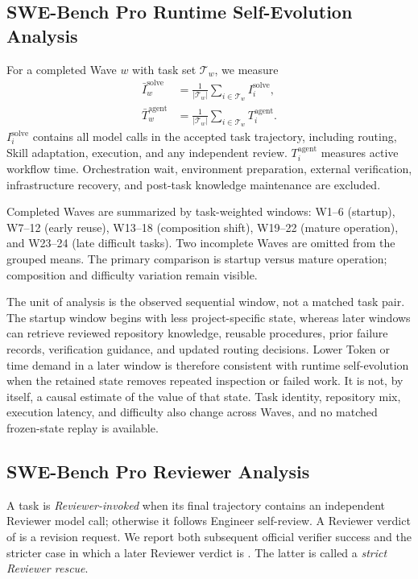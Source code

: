 \subsection{SWE-Bench Pro Runtime Self-Evolution Analysis}

For a completed \systemname Wave $w$ with task set $\mathcal{T}_w$, we measure
\begin{align}
  \bar I_w^{\mathrm{solve}}
  &= \frac{1}{|\mathcal{T}_w|}
     \sum_{i\in\mathcal{T}_w} I_i^{\mathrm{solve}},
  \label{eq:solve-token-wave}\\
  \bar T_w^{\mathrm{agent}}
  &= \frac{1}{|\mathcal{T}_w|}
     \sum_{i\in\mathcal{T}_w} T_i^{\mathrm{agent}}.
  \label{eq:solve-time-wave}
\end{align}
$I_i^{\mathrm{solve}}$ contains all model calls in the accepted task trajectory,
including routing, Skill adaptation, execution, and any independent review.
$T_i^{\mathrm{agent}}$ measures active
workflow time. Orchestration wait, environment preparation, external verification,
infrastructure recovery, and post-task knowledge maintenance are excluded.

Completed Waves are summarized by task-weighted windows: W1--6 (startup), W7--12
(early reuse), W13--18 (composition shift), W19--22 (mature operation), and
W23--24 (late difficult tasks). Two incomplete Waves are omitted from the grouped
means. The primary comparison is startup versus mature operation; composition and
difficulty variation remain visible.

The unit of analysis is the observed sequential window, not a matched task pair.
The startup window begins with less project-specific state, whereas later windows
can retrieve reviewed repository knowledge, reusable procedures, prior failure
records, verification guidance, and updated routing decisions. Lower Token or time
demand in a later window is therefore consistent with runtime self-evolution when
the retained state removes repeated inspection or failed work. It is not, by
itself, a causal estimate of the value of that state. Task identity, repository
mix, execution latency, and difficulty also change across Waves, and no matched
frozen-state replay is available.

\subsection{SWE-Bench Pro Reviewer Analysis}

A task is \emph{Reviewer-invoked} when its final trajectory contains an independent
Reviewer model call; otherwise it follows Engineer self-review. A Reviewer verdict
of  is a revision request. We report both subsequent official
verifier success and the stricter case in which a later Reviewer verdict is
. The latter is called a \emph{strict Reviewer rescue}.

